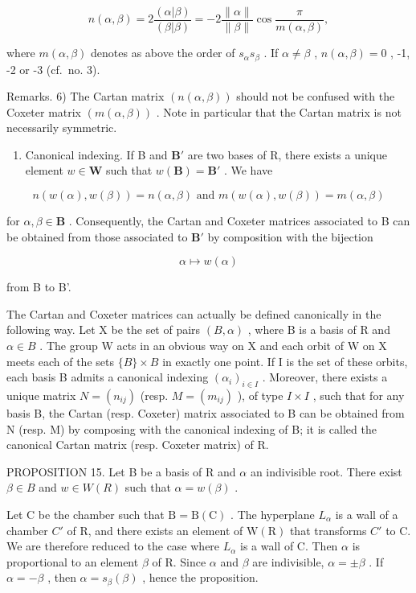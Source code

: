 \[
n (\alpha , \beta) = 2 \frac {(\alpha | \beta)}{(\beta | \beta)} = - 2 \frac {\| \alpha \|}{\| \beta \|} \cos \frac {\pi}{m (\alpha , \beta)},\tag{11}
\]

where \(m(\alpha, \beta)\) denotes as above the order of \(s_{\alpha}s_{\beta}\) . If \(\alpha \neq \beta\) , \(n(\alpha, \beta) = 0\) , -1, -2 or -3 (cf.~no. 3).

Remarks. 6) The Cartan matrix \((n(\alpha,\beta))\) should not be confused with the Coxeter matrix \((m(\alpha,\beta))\) . Note in particular that the Cartan matrix is not necessarily symmetric.

\begin{enumerate}
\def\labelenumi{\arabic{enumi})}
\setcounter{enumi}{6}
\tightlist
\item
  Canonical indexing. If B and \(\mathbf{B}'\) are two bases of R, there exists a unique element \(w \in \mathbf{W}\) such that \(w(\mathbf{B}) = \mathbf{B}'\) . We have
\end{enumerate}

\[
n (w (\alpha), w (\beta)) = n (\alpha , \beta) \text { and } m (w (\alpha), w (\beta)) = m (\alpha , \beta)
\]

for \(\alpha, \beta \in \mathbf{B}\) . Consequently, the Cartan and Coxeter matrices associated to B can be obtained from those associated to \(\mathbf{B}'\) by composition with the bijection

\[
\alpha \mapsto w (\alpha)
\]

from B to B'.

The Cartan and Coxeter matrices can actually be defined canonically in the following way. Let X be the set of pairs \((B, \alpha)\) , where B is a basis of R and \(\alpha \in B\) . The group W acts in an obvious way on X and each orbit of W on X meets each of the sets \(\{B\} \times B\) in exactly one point. If I is the set of these orbits, each basis B admits a canonical indexing \((\alpha_{i})_{i \in I}\) . Moreover, there exists a unique matrix \(N = (n_{ij})\) (resp. \(M = (m_{ij})\) ), of type \(I \times I\) , such that for any basis B, the Cartan (resp. Coxeter) matrix associated to B can be obtained from N (resp. M) by composing with the canonical indexing of B; it is called the canonical Cartan matrix (resp. Coxeter matrix) of R.

PROPOSITION 15. Let B be a basis of R and \(\alpha\) an indivisible root. There exist \(\beta \in B\) and \(w \in W(R)\) such that \(\alpha = w(\beta)\) .

Let C be the chamber such that \(\mathrm{B} = \mathrm{B}(\mathrm{C})\) . The hyperplane \(L_{\alpha}\) is a wall of a chamber \(C'\) of R, and there exists an element of \(\mathrm{W}(\mathrm{R})\) that transforms \(C'\) to C. We are therefore reduced to the case where \(L_{\alpha}\) is a wall of C. Then \(\alpha\) is proportional to an element \(\beta\) of R. Since \(\alpha\) and \(\beta\) are indivisible, \(\alpha = \pm\beta\) . If \(\alpha = -\beta\) , then \(\alpha = s_{\beta}(\beta)\) , hence the proposition.

